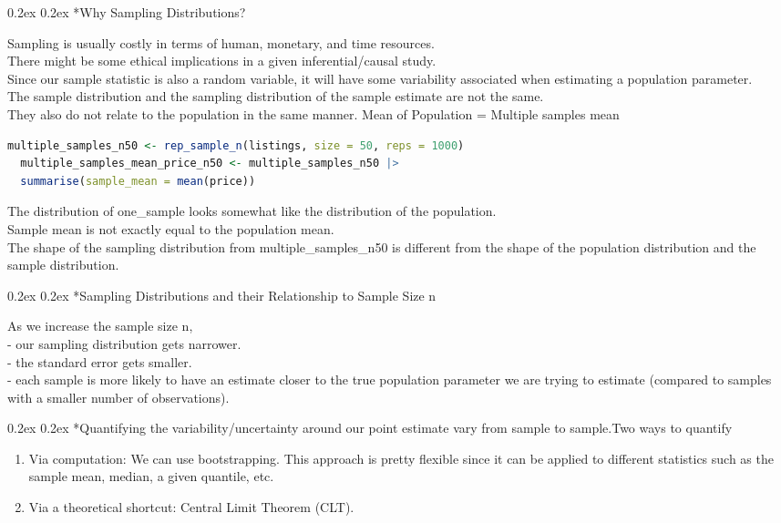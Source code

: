 \documentclass[8pt,landscape]{article}
\makeatletter
\renewcommand{\subsection}{\@startsection{subsection}{2}{0pt}%
    {0.2ex}%
    {0.2ex}%
    {\fontsize{8}{8}\bfseries\color{blue}}} %
\newcommand{\smalltext}[1]{%
  {\fontsize{8}{7}\selectfont\sloppy #1\par}%
}
\makeatother
\begin{document}
\begin{multicols}{3}
\subsection*{Why Sampling Distributions?}
\smalltext{Sampling is usually costly in terms of human, monetary, and time resources. \\
There might be some ethical implications in a given inferential/causal study. \\
Since our sample statistic is also a random variable, it will have some variability associated when estimating a population parameter.\\
The sample distribution and the sampling distribution of the sample estimate are not the same. \\
They also do not relate to the population in the same manner.
Mean of Population = Multiple samples mean 
}
\begin{lstlisting}[language=R]
  multiple_samples_n50 <- rep_sample_n(listings, size = 50, reps = 1000) 
  multiple_samples_mean_price_n50 <- multiple_samples_n50 |>
  summarise(sample_mean = mean(price))
\end{lstlisting}
\smalltext{The distribution of one\_sample looks somewhat like the distribution of the population. \\
Sample mean is not exactly equal to the population mean. \\
The shape of the sampling distribution from multiple\_samples\_n50 is different from the shape of the population distribution and the sample distribution. \\
}
\subsection*{Sampling Distributions and their Relationship to Sample Size n}
\smalltext{As we increase the sample size n, \\
 - our sampling distribution gets narrower. \\
 - the standard error gets smaller. \\
 - each sample is more likely to have an estimate closer to the true population parameter we are trying to estimate (compared to samples with a smaller number of observations).
}
\subsection*{Quantifying the variability/uncertainty around our point estimate vary from sample to sample.Two ways to quantify}
\begin{enumerate}\fontsize{8}{8}\selectfont
 \item Via computation: We can use bootstrapping. This approach is pretty flexible since it can be applied to different statistics such as the sample mean, median, a given quantile, etc.
 \item Via a theoretical shortcut: Central Limit Theorem (CLT).
\end{enumerate}


\end{multicols}
\end{document}
